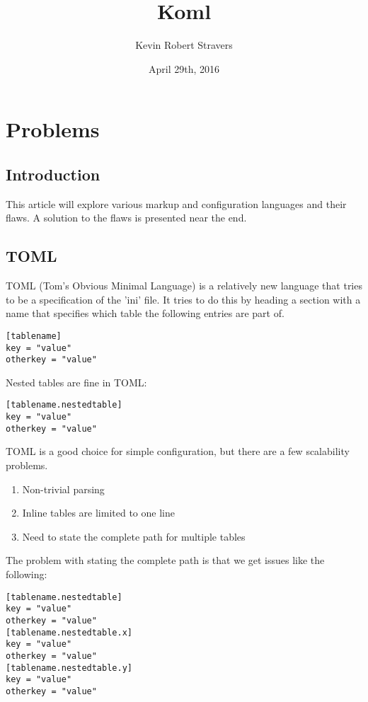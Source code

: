 \documentclass[listof=totoc]{article}
\title{Koml}
\author{Kevin Robert Stravers}
\date{April 29th, 2016}
\begin{document}
\maketitle

\iffalse
	\tableofcontents
	\lstlistoflistings
\fi

\chapter{Problems}
\section{Introduction}
This article will explore various markup and configuration languages and their flaws. A solution to the flaws is presented near the end.

\section{TOML}
TOML (Tom's Obvious Minimal Language) is a relatively new language that tries to be a specification of the 'ini' file.
It tries to do this by heading a section with a name that specifies which table the following entries are part of.

\begin{verbatim}
[tablename]
key = "value"
otherkey = "value"
\end{verbatim}

Nested tables are fine in TOML:

\begin{verbatim}
[tablename.nestedtable]
key = "value"
otherkey = "value"
\end{verbatim}

TOML is a good choice for simple configuration, but there are a few scalability problems.

\begin{enumerate}
	\item Non-trivial parsing
	\item Inline tables are limited to one line
	\item Need to state the complete path for multiple tables
\end{enumerate}

The problem with stating the complete path is that we get issues like the following:

\begin{verbatim}
[tablename.nestedtable]
key = "value"
otherkey = "value"
[tablename.nestedtable.x]
key = "value"
otherkey = "value"
[tablename.nestedtable.y]
key = "value"
otherkey = "value"
\end{verbatim}
\end{document}
